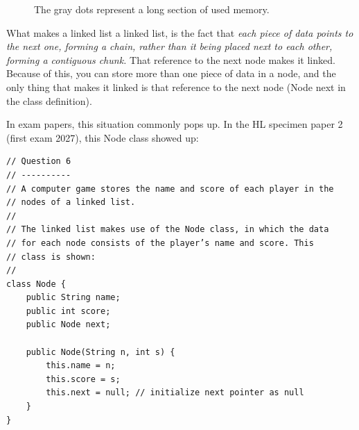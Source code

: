 \documentclass[./main.tex]{subfiles}
\begin{document}
\begin{figure}[htbp]
    \centering
    \caption{The gray dots represent a long section of used memory.}
    \label{fig:ll-append}
\end{figure}

What makes a linked list a linked list, is the fact that \emph{each piece of data points to the next one, forming a chain, rather
than it being placed next to each other, forming a contiguous chunk.} That reference to the next node makes it linked. Because of
this, you can store more than one piece of data in a node, and the only thing that makes it linked is that reference to
the next node ({\mono Node next} in the class definition).

In exam papers, this situation commonly pops up. In the HL specimen paper 2 (first exam 2027), this Node class showed
up:

\begin{verbatim}
// Question 6
// ----------
// A computer game stores the name and score of each player in the
// nodes of a linked list.
// 
// The linked list makes use of the Node class, in which the data
// for each node consists of the player’s name and score. This 
// class is shown:
//
class Node {
    public String name;
    public int score;
    public Node next;

    public Node(String n, int s) {
        this.name = n;
        this.score = s;
        this.next = null; // initialize next pointer as null
    }
}
\end{verbatim}
\end{document}
